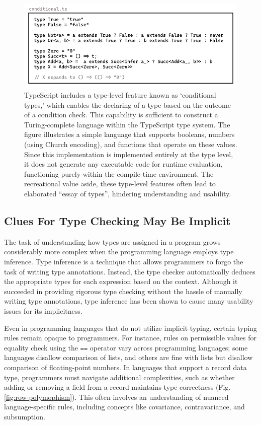 \begin{figure}[htbp]
  \centering
  \includegraphics[width=\linewidth]{Conditional}
  \caption[An example of encoding propositional logic operators and church numerals in  TypeScript's conditional types]{
    \label{fig:ts-conditional}
    TypeScript includes a type-level feature known as `conditional types,' which enables the declaring of a type based on the outcome of a condition check. This capability is sufficient to construct a Turing-complete language within the TypeScript type system. The figure illustrates a simple language that supports booleans, numbers (using Church encoding), and functions that operate on these values. Since this implementation is implemented entirely at the type level, it does not generate any executable code for runtime evaluation, functioning purely within the compile-time environment. The recreational value aside, these type-level features often lead to elaborated ``essay of types'', hindering understanding and usability.
    }
\end{figure}

\subsection*{Clues For Type Checking May Be Implicit}

The task of understanding how types are assigned in a program grows considerably more complex when the programming language employs type inference. Type inference \cite{Damas1982-zw} is a technique that allows programmers to forgo the task of writing type annotations. Instead, the type checker automatically deduces the appropriate types for each expression based on the context. Although it succeeded in providing rigorous type checking without the hassle of manually writing type annotations, type inference has been shown to cause many usability issues \cite{Jun2002-xp, Wand1986-lu} for its implicitness.  

Even in programming languages that do not utilize implicit typing, certain typing rules remain opaque to programmers. For instance, rules on permissible values for equality check using the \texttt{==} operator vary across programming languages; some languages disallow comparison of lists, and others are fine with lists but disallow comparison of floating-point numbers. In languages that support a record data type, programmers must navigate additional complexities, such as whether adding or removing a field from a record maintains type correctness (Fig. \ref{fig:row-polymophism}). This often involves an understanding of nuanced language-specific rules, including concepts like covariance, contravariance, and subsumption.

